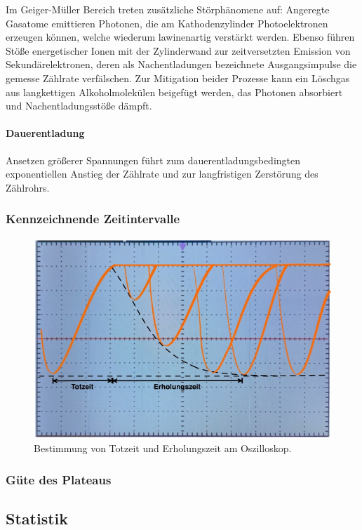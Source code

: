 Im Geiger-Müller Bereich treten zusätzliche Störphänomene auf: Angeregte Gasatome emittieren Photonen, die am Kathodenzylinder Photoelektronen 
erzeugen können, welche wiederum lawinenartig verstärkt werden. Ebenso führen Stöße energetischer Ionen mit der Zylinderwand zur zeitversetzten
Emission von Sekundärelektronen, deren als Nachentladungen bezeichnete Ausgangsimpulse die gemesse Zählrate verfälschen. Zur Mitigation beider
Prozesse kann ein Löschgas aus langkettigen Alkoholmolekülen beigefügt werden, das Photonen absorbiert und Nachentladungsstöße dämpft.

\paragraph{Dauerentladung}

Ansetzen größerer Spannungen führt zum dauerentladungsbedingten exponentiellen Anstieg der Zählrate und zur langfristigen Zerstörung des Zählrohrs. 

\subsubsection{Kennzeichnende Zeitintervalle}

\begin{figure}[H]
	\centering
	\includegraphics[width=0.5\linewidth]{content/grafik/zeit_soll.jpg}
	\caption{Bestimmung von Totzeit und Erholungszeit am Oszilloskop.}
	\label{fig:zeit_soll}
\end{figure}

\subsubsection{Güte des Plateaus}

\subsection{Statistik}

